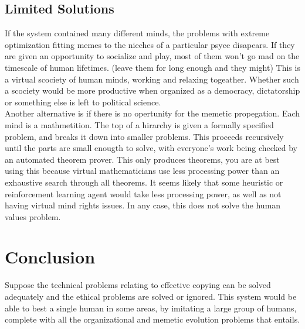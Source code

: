 \documentclass[12pt]{article}
\begin{document}
\subsection{Limited Solutions}
If the system contained many different minds, the problems with extreme optimization fitting memes to the nieches of a particular psyce disapears. If they are given an opportunity to socialize and play, most of them won't go mad on the timescale of human lifetimes. (leave them for long enough and they might) This is a virtual scociety of human minds, working and relaxing togeather. Whether such a scociety would be more productive when organized as a democracy, dictatorship or something else is left to political science. \\
Another alternative  is if there is no opertunity for the memetic propegation. Each mind is a mathmetition. The top of a hirarchy is given a formally specified problem, and breaks it down into smaller problems. This proceeds recursively until the parts are small enougth to solve, with everyone’s work being checked by an automated theorem prover. This only produces theorems, you are at best using this because virtual mathematicians use less processing power than an exhaustive search through all theorems. It seems likely that some heuristic or reinforcement learning agent would take less processing power, as well as not having virtual mind rights issues. In any case, this does not solve the human values problem.
\section{Conclusion}
Suppose the technical problems relating to effective copying can be solved adequately and the ethical problems are solved or ignored. This system would be able to best a single human in some areas, by imitating a large group of humans, complete with all the organizational and memetic evolution problems that entails. 
\end{document}

